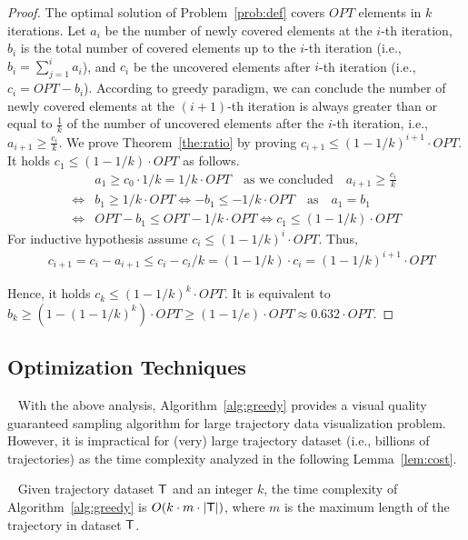 \begin{proof}
The optimal solution of Problem~\ref{prob:def} covers $OPT$ elements in $k$ iterations.
Let $a_i$ be the number of newly covered elements at the $i$-th iteration, $b_i$ is the total number of covered elements up to the $i$-th iteration (i.e., $b_i = \sum_{j=1}^{i}a_i$),
and $c_i$ be the uncovered elements after $i$-th iteration (i.e., $c_i = OPT-b_i$).
According to greedy paradigm, we can conclude the number of newly covered elements at the $(i+1)$-th iteration is always greater than or equal to $\frac{1}{k}$ of the number of uncovered elements after the $i$-th iteration, i.e., $a_{i+1} \geq \frac{c_i}{k}$.
We prove Theorem~\ref{the:ratio} by proving $c_{i+1} \leq (1-1/k)^{i+1} \cdot OPT$.
It holds $c_1 \leq (1-1/k) \cdot OPT$ as follows.
\begin{align} \nonumber
& a_1 \geq c_0 \cdot 1/k = 1/k \cdot OPT \text{~~~as we concluded~~~} a_{i+1} \geq \frac{c_i}{k}\\ \nonumber
 \Leftrightarrow  & b_1 \geq 1/k \cdot OPT  \Leftrightarrow  -b_1 \leq - 1/k \cdot OPT  \text{~~~as~~~} a_1 = b_1\\ \nonumber
 \Leftrightarrow & OPT - b_ 1 \leq OPT - 1/k \cdot OPT  \Leftrightarrow  c_1 \leq (1-1/k) \cdot OPT
\end{align}
For inductive hypothesis assume $c_{i} \leq (1-1/k)^i \cdot OPT$. Thus,
\begin{align} \nonumber
& c_{i+1} = c_i - a_{i+1} \leq c_i - c_i/k = (1-1/k) \cdot c_i = (1-1/k)^{i+1} \cdot OPT
\end{align}

Hence, it holds $c_k \leq (1-1/k)^{k} \cdot OPT$.
It is equivalent to $b_k \geq (1 - (1-1/k)^{k}) \cdot OPT \geq (1-1/e) \cdot OPT \approx 0.632 \cdot OPT$.
\end{proof}


\subsection{Optimization Techniques}~\label{sec:opt}
With the above analysis, Algorithm~\ref{alg:greedy} provides a visual quality guaranteed sampling algorithm for large trajectory data visualization problem.
However, it is impractical for (very) large trajectory dataset (i.e., billions of trajectories) as the time complexity analyzed in the following Lemma~\ref{lem:cost}.

\begin{lemma}~\label{lem:cost}
Given trajectory dataset $\mathsf{T}$ and an integer $k$, the time complexity of Algorithm~\ref{alg:greedy} is $O(k \cdot m \cdot |\mathsf{T}|)$, where $m$ is the maximum length of the trajectory in dataset $\mathsf{T}$.
\end{lemma}

